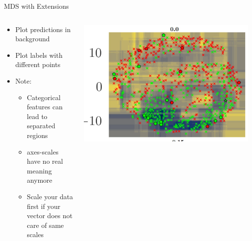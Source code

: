 \documentclass[aspectratio=169]{../latex_main/tntbeamer}  %
\begin{document}
	\begin{frame}[c]{MDS with Extensions}
        
        \begin{columns}
        
        \begin{column}{0.5\textwidth}
        
        \begin{itemize}
            \item Plot predictions in background
            \item Plot labels with different points
            \smallskip
            \item Note: 
            \begin{itemize}
                \item Categorical features can lead to separated regions
                \item axes-scales have no real meaning anymore
                \item Scale your data first if your vector does not care of same scales 
            \end{itemize}
        \end{itemize}
        
        \end{column}
        
        \begin{column}{0.5\textwidth}
        
        \begin{center}
            \includegraphics[width=1\textwidth]{mds1.jpg}
        \end{center}
        
        \end{column}
        
        \end{columns}
        
	\end{frame}
	
\end{document}
